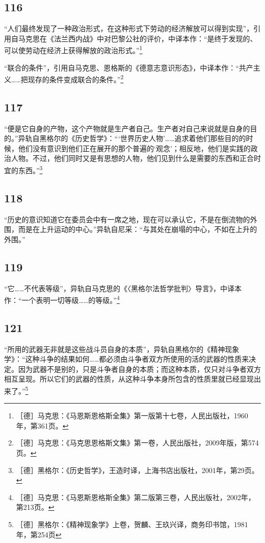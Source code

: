 \documentclass[fontset=fandol, a4paper, 12pt, openright]{ctexbook}
\begin{document}
\subsection*{116}
“人们最终发现了一种政治形式，在这种形式下劳动的经济解放可以得到实现”，引用自马克思在《法兰西内战》中对巴黎公社的评价，中译本作：“是终于发现的、可以使劳动在经济上获得解放的政治形式。”\footnote{［德］马克思：《马恩斯恩格斯全集》第一版第十七卷，人民出版社，1960年，第361页。}

“联合的条件”，引用自马克思、恩格斯的《德意志意识形态》，中译本作：“共产主义……把现存的条件变成联合的条件。”\footnote{［德］马克思：《马克思恩格斯文集》第一卷，人民出版社，2009年版，第574页。}

\subsection*{117}
“便是它自身的产物，这个产物就是生产者自己。生产者对自己来说就是自身的目的。”异轨自黑格尔的《历史哲学》：“‘世界历史人物’……追求着他们那些目的的时候，他们没有意识到他们正在展开的那个普遍的‘观念’；相反地，他们是实践的政治人物。不过，他们同时又是有思想的人物，他们见到什么是需要的东西和正合时宜的东西。”\footnote{［德］黑格尔：《历史哲学》，王造时译，上海书店出版社，2001年，第29页。}

\subsection*{118}
“历史的意识知道它在委员会中有一席之地，现在可以承认它，不是在倒流物的外围，而是在上升运动的中心。”异轨自尼采：“与其处在崩塌的中心，不如在上升的外围。”

\subsection*{119}
“它……不代表等级”，异轨自马克思的《〈黑格尔法哲学批判〉导言》，中译本作：“一个表明一切等级……的等级。”\footnote{［德］马克思：《马恩斯恩格斯全集》第二版第三卷，人民出版社，2002年，第213页。}

\subsection*{121}
“所用的武器无非就是这些战斗员自身的本质”，异轨自黑格尔的《精神现象学》：“这种斗争的结果如何……都必须由斗争者双方所使用的活的武器的性质来决定。因为武器不是别的，只是斗争者自身的本质；而这种本质，仅只对斗争者双方相互呈现。所以它们的武器的性质，从这种斗争本身所包含的性质里就已经显现出来了。”\footnote{［德］黑格尔：《精神现象学》上卷，贺麟、王玖兴译，商务印书馆，1981年，第254页}
\end{document}

